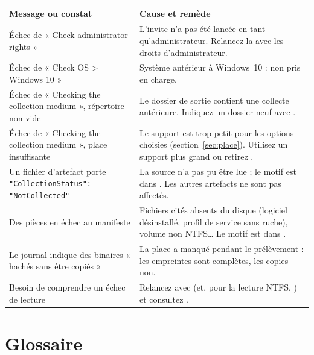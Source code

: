 \documentclass[11pt,a4paper,oneside]{report}
\begin{document}
\begin{longtable}{@{}L{5cm}L{9.4cm}@{}}
\toprule
\bfseries Message ou constat & \bfseries Cause et remède \\
\midrule
\endhead
Échec de « Check administrator rights » & L'invite n'a pas été lancée en tant
  qu'administrateur. Relancez-la avec les droits d'administrateur. \\
Échec de « Check OS >= Windows 10 » & Système antérieur à Windows~10 : non pris
  en charge. \\
Échec de « Checking the collection medium », répertoire non vide & Le dossier de
  sortie contient une collecte antérieure. Indiquez un dossier neuf avec
  . \\
Échec de « Checking the collection medium », place insuffisante & Le support
  est trop petit pour les options choisies (section~\ref{sec:place}). Utilisez un
  support plus grand ou retirez . \\
Un fichier d'artefact porte \texttt{"CollectionStatus": "NotCollected"} &
  La source n'a pas pu être lue ; le motif est dans . Les autres
  artefacts ne sont pas affectés. \\
Des pièces en échec au manifeste & Fichiers cités absents du disque (logiciel
  désinstallé, profil de service sans ruche), volume non NTFS\ldots{} Le motif est
  dans . \\
Le journal indique des binaires « hachés sans être copiés » & La place a manqué
  pendant le prélèvement : les empreintes sont complètes, les copies non. \\
Besoin de comprendre un échec de lecture & Relancez avec  (et, pour
  la lecture NTFS, ) et consultez . \\
\bottomrule
\end{longtable}

\appendix

\chapter{Glossaire}
\end{document}
